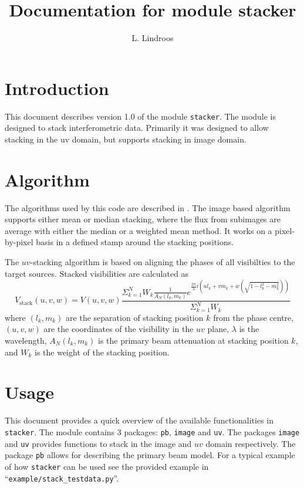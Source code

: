 \documentclass{article}
\title{Documentation for module stacker}
\author{L. Lindroos}
\begin{document}
\maketitle

\section{Introduction}
This document describes version 1.0 of the module {\tt stacker}.
The module is designed to stack interferometric data.
Primarily it was designed to allow stacking in the uv domain, 
but supports stacking in image domain.

\section{Algorithm}
The algorithms used by this code are described in \cite{lindroos2014}.
The image based algorithm supports either mean or median stacking,
where the flux from subimages are average with either the median or a weighted mean method.
It works on a pixel-by-pixel basis in a defined stamp around the stacking positions.

The $uv$-stacking algorithm is based on aligning the phases of all visibilties to the target sources.
Stacked visibilities are calculated as 
\begin{equation}
	V_\mathrm{stack}(u,v,w) = V(u,v,w) \frac{\Sigma_{k=1}^N W_k \frac{1}{A_N(l_k, m_k)} e^{\frac{2\pi}{\lambda} i \left( u l_k + v m_k + w(\sqrt{1-l_k^2-m_k^2})\right)} 
	}{\Sigma_{k=1}^N W_k}
	\label{eq:uvstack}
\end{equation}
where $(l_k, m_k)$ are the separation of stacking position $k$ from the phase centre,
$(u,v,w)$ are the coordinates of the visibility in the $uv$ plane,
$\lambda$ is the wavelength, 
$A_N(l_k, m_k)$ is the primary beam attenuation at stacking position $k$,
and $W_k$ is the weight of the stacking position.

\section{Usage}
This document provides a quick overview of the available functionalities in {\tt stacker}.
The module contains 3 packages: {\tt pb}, {\tt image} and {\tt uv}.
The packages {\tt image} and {\tt uv} provides functions to stack in the image and $uv$ domain respectively.
The package {\tt pb} allows for describing the primary beam model.
For a typical example of how {\tt stacker} can be used see the provided example in ``{\tt example/stack\_testdata.py}''.
\end{document}
